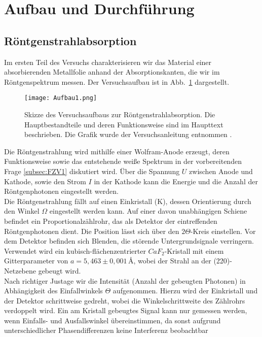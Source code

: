 \section{\label{sec:aufbau}Aufbau und Durchführung}
\subsection{\label{subsec:vers1}Röntgenstrahlabsorption}
Im ersten Teil des Versuchs charakterisieren wir das Material einer absorbierenden Metallfolie anhand 
der Absorptionskanten, die wir im Röntgenspektrum messen. Der Versuchsaufbau ist in Abb.~\ref{fig:vers1}
dargestellt.
\begin{figure}[h!]
    \centering
    \texttt{[image: Aufbau1.png]}
    \caption{Skizze des Versuchsaufbaus zur Röntgenstrahlabsorption. Die Hauptbestandteile und deren 
    Funktionsweise sind im Haupttext beschrieben. Die Grafik wurde der Versuchsanleitung entnommen \cite{Anleitung}.}
    \label{fig:vers1}
\end{figure}\FloatBarrier
Die Röntgenstrahlung wird mithilfe einer Wolfram-Anode erzeugt, deren Funktionsweise 
sowie das entstehende weiße Spektrum in der vorbereitenden 
Frage \ref{subsec:FZV1} diskutiert wird. Über die Spannung $U$ zwischen Anode und 
Kathode, sowie den Strom $I$ in der Kathode kann die Energie und die Anzahl der 
Röntgenphotonen eingestellt werden. \\
Die Röntgenstrahlung fällt auf einen Einkristall (K), dessen Orientierung 
durch den Winkel $\Omega$ eingestellt werden kann. Auf einer davon unabhängigen 
Schiene befindet ein Proportionalzählrohr, das als Detektor der eintreffenden 
Röntgenphotonen dient. Die Position lässt sich über den $2\Theta$-Kreis einstellen. 
Vor dem Detektor befinden sich Blenden, die störende Untergrundsignale 
verringern. \\
Verwendet wird ein kubisch-flächenzentrierter $CaF_{2}$-Kristall mit 
einem Gitterparameter von $a= 5,463\pm 0,001\,\si{\angstrom}$, wobei 
der Strahl an der (220)-Netzebene gebeugt wird. \\
Nach richtiger Justage wir die Intensität (Anzahl der gebeugten Photonen) in 
Abhängigkeit des Einfallwinkels $\Theta$ aufgenommen. Hierzu wird der 
Einkristall und der Detektor schrittweise gedreht, wobei die Winkelschrittweite 
des Zählrohrs verdoppelt wird. Ein am Kristall gebeugtes Signal kann nur 
gemessen werden, wenn Einfalls- und Ausfallswinkel übereinstimmen, da 
sonst aufgrund unterschiedlicher Phasendifferenzen keine Interferenz beobachtbar
